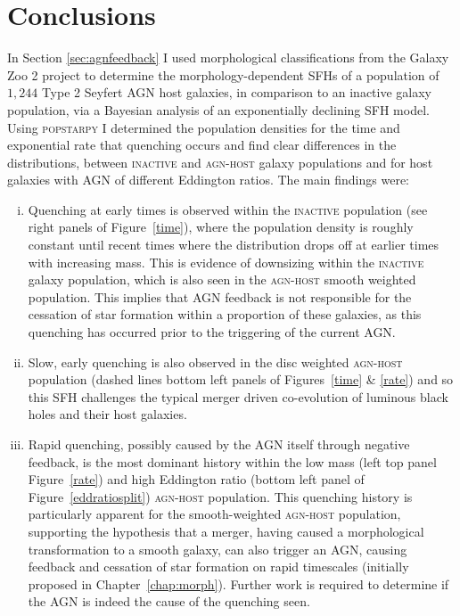 {\section{Conclusions}\label{sec:agnconclusion}

In Section \ref{sec:agnfeedback} I used morphological classifications from the Galaxy Zoo 2 project to determine the morphology-dependent SFHs of a population of $1,244$ Type 2 Seyfert AGN host galaxies, in comparison to an inactive galaxy population, via a Bayesian analysis of an exponentially declining SFH model. Using \textsc{popstarpy} I determined the population densities for the time and exponential rate that quenching occurs and find clear differences in the distributions, between \textsc{inactive} and \textsc{agn-host} galaxy populations and for host galaxies with AGN of different Eddington ratios. The main findings were:

\begin{enumerate}[(i)]
\item Quenching at early times is observed within the \textsc{inactive} population (see right panels of Figure~\ref{time}), where the population density is roughly constant until recent times where the distribution drops off at earlier times with increasing mass. This is evidence of downsizing within the \textsc{inactive} galaxy population, which is also seen in the \textsc{agn-host} smooth weighted population. This implies that AGN feedback is not responsible for the cessation of star formation within a proportion of these galaxies, as this quenching has occurred prior to the triggering of the current AGN.

\item Slow, early quenching is also observed in the disc weighted \textsc{agn-host} population (dashed lines bottom left panels of Figures~\ref{time} \& \ref{rate}) and so this SFH challenges the typical merger driven co-evolution of luminous black holes and their host galaxies.

\item Rapid quenching, possibly caused by the AGN itself through negative feedback, is the most dominant history within the low mass (left top panel Figure~\ref{rate}) and high Eddington ratio (bottom left panel of Figure~\ref{eddratiosplit}) \textsc{agn-host} population. This quenching history is particularly apparent for the smooth-weighted \textsc{agn-host} population, supporting the hypothesis that a merger, having caused a morphological transformation to a smooth galaxy, can also trigger an AGN, causing feedback and cessation of star formation on rapid timescales (initially proposed in Chapter~\ref{chap:morph}). Further work is required to determine if the AGN is indeed the cause of the quenching seen. 


\end{enumerate}}
